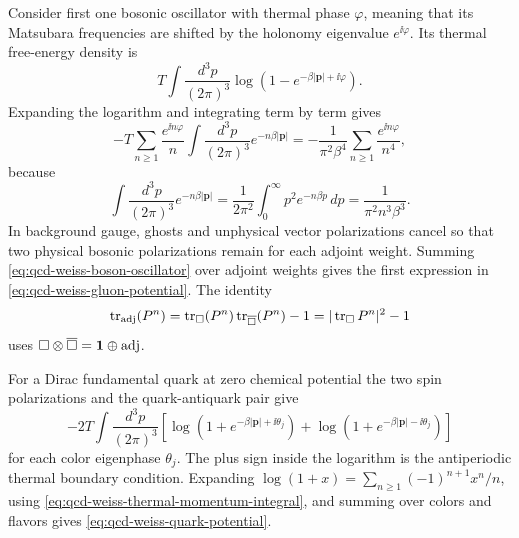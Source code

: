 Consider first one bosonic oscillator with thermal phase \(\varphi\), meaning
that its Matsubara frequencies are shifted by the holonomy eigenvalue
\(e^{\ii\varphi}\).  Its thermal free-energy density is
\[
  T\int\frac{d^3p}{(2\pi)^3}
  \log\left(1-e^{-\beta |\mathbf p|+\ii\varphi}\right).
\]
Expanding the logarithm and integrating term by term gives
\begin{equation}
  -T\sum_{n\ge1}\frac{e^{\ii n\varphi}}{n}
  \int\frac{d^3p}{(2\pi)^3}e^{-n\beta|\mathbf p|}
  =
  -\frac{1}{\pi^2\beta^4}
  \sum_{n\ge1}\frac{e^{\ii n\varphi}}{n^4},
  \label{eq:qcd-weiss-boson-oscillator}
\end{equation}
because
\begin{equation}
  \int\frac{d^3p}{(2\pi)^3}e^{-n\beta|\mathbf p|}
  =
  \frac{1}{2\pi^2}\int_0^\infty p^2e^{-n\beta p}\,dp
  =
  \frac{1}{\pi^2n^3\beta^3}.
  \label{eq:qcd-weiss-thermal-momentum-integral}
\end{equation}
In background gauge, ghosts and unphysical vector polarizations cancel so
that two physical bosonic polarizations remain for each adjoint weight.
Summing \eqref{eq:qcd-weiss-boson-oscillator} over adjoint weights gives the
first expression in \eqref{eq:qcd-weiss-gluon-potential}.  The identity
\[
  \operatorname{tr}_{\rm adj}(P^n)
  =
  \operatorname{tr}_{\square}(P^n)
  \operatorname{tr}_{\overline\square}(P^n)-1
  =
  |\operatorname{tr}_{\square}P^n|^2-1
\]
uses \(\square\otimes\overline\square=\mathbf1\oplus{\rm adj}\).

For a Dirac fundamental quark at zero chemical potential the two spin
polarizations and the quark-antiquark pair give
\[
  -2T\int\frac{d^3p}{(2\pi)^3}
  \left[
    \log\left(1+e^{-\beta|\mathbf p|+\ii\theta_j}\right)
    +
    \log\left(1+e^{-\beta|\mathbf p|-\ii\theta_j}\right)
  \right]
\]
for each color eigenphase \(\theta_j\).  The plus sign inside the logarithm
is the antiperiodic thermal boundary condition.  Expanding
\(\log(1+x)=\sum_{n\ge1}(-1)^{n+1}x^n/n\), using
\eqref{eq:qcd-weiss-thermal-momentum-integral}, and summing over colors and
flavors gives \eqref{eq:qcd-weiss-quark-potential}.

